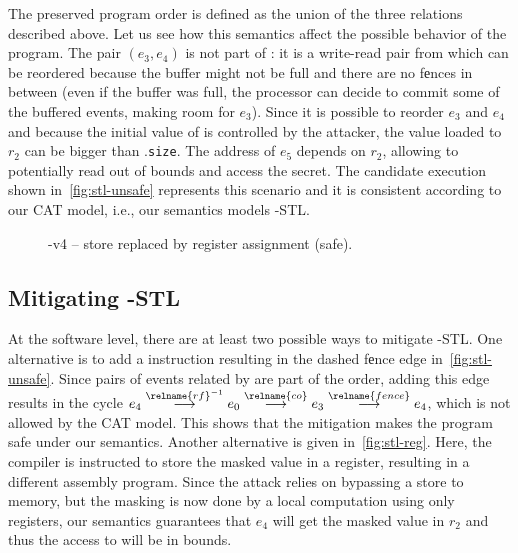 \documentclass[conference]{IEEEtran}
\begin{document}
The preserved program order  is defined as the union of the three relations described above.
Let us see how this semantics affect the possible behavior of the program.
The pair $(e_3,e_4)$ is not part of : it is a write-read pair from  which can be reordered because the buffer might not be full  %
and there are no {\selectfont f{е}nces} in between (even if the buffer was full, the processor can decide to commit some of the buffered events, making room for $e_3$).
Since it is possible to reorder $e_3$ and $e_4$ and because the initial value of \varidx is controlled by the attacker, the value loaded to $r_2$ can be bigger than \varA.\texttt{size}.
The address of $e_5$ depends on $r_2$, allowing to potentially read out of bounds and access the secret.
The candidate execution shown in~\autoref{fig:stl-unsafe} represents this scenario and it is consistent according to our CAT model, i.e., our semantics models \spectre-\textsc{STL}.

\begin{figure}[t]
\centering
\scalebox{.8}{}
\caption{\spectre-v4 -- store replaced by register assignment (safe).}
\label{fig:stl-reg}
\end{figure}

\subsection{Mitigating \spectre-\textsc{STL}}
\label{sec:mitigating_sv4}

At the software level, there are at least two possible ways to mitigate \spectre-\textsc{STL}.
One alternative is to add a \fence instruction resulting in the dashed {\selectfont f{е}nce} edge in~\autoref{fig:stl-unsafe}.
Since pairs of events related by  are part of the  order, adding this edge results in the cycle $e_4 \stackrel{\relname{\scriptsize rf}^{-1}}{\longrightarrow} e_0 \stackrel{\relname{\scriptsize co}}{\longrightarrow} e_3 \stackrel{\relname{\scriptsize fence}}{\longrightarrow} e_4$, which is not allowed by the CAT model.
This shows that the mitigation makes the program safe under our semantics.
Another alternative is given in~\autoref{fig:stl-reg}.
Here, the compiler is instructed to store the masked value in a register, resulting in a different assembly program. 
Since the attack relies on bypassing a store to memory, but the masking is now done by a local computation using only registers, our semantics guarantees that $e_4$ will get the masked value in $r_2$ and thus the access to \varA will be in bounds.
\end{document}
